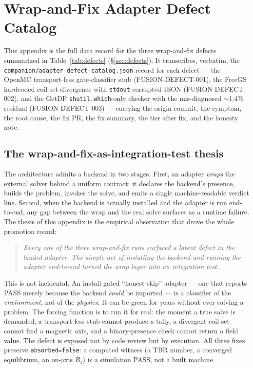 \section{Wrap-and-Fix Adapter Defect Catalog}
\label{app:adapters}

This appendix is the full data record for the three wrap-and-fix
defects summarized in Table~\ref{tab:defects}
(\S\ref{sec:defects}). It transcribes, verbatim, the
\texttt{companion/\allowbreak adapter-defect-catalog.json} record for each
defect --- the OpenMC transport-less gate-classifier stub
(FUSION-DEFECT-001), the FreeGS hardcoded coil-set divergence with
\texttt{stdout}-corrupted JSON (FUSION-DEFECT-002), and the GetDP
\texttt{shutil.which}-only checker with the mis-diagnosed $\sim$1.4\%
residual (FUSION-DEFECT-003) --- carrying the origin commit, the
symptom, the root cause, the fix PR, the fix summary, the tier after
fix, and the honesty note.

\subsection{The wrap-and-fix-as-integration-test thesis}
\label{app:adapters:thesis}

The architecture admits a backend in two stages. First, an adapter
\emph{wraps} the external solver behind a uniform contract: it declares
the backend's presence, builds the problem, invokes the solve, and emits
a single machine-readable verdict line. Second, when the backend is
actually installed and the adapter is run end-to-end, any gap between
the wrap and the real solve surfaces as a runtime failure. The thesis of
this appendix is the empirical observation that drove the whole
promotion round:

\begin{quote}
\emph{Every one of the three wrap-and-fix runs surfaced a latent defect
in the landed adapter. The simple act of installing the backend and
running the adapter end-to-end turned the wrap layer into an integration
test.}
\end{quote}

This is not incidental. An install-gated ``honest-skip'' adapter ---
one that reports PASS merely because the backend \emph{could} be
imported --- is a classifier of the \emph{environment}, not of the
\emph{physics}. It can be green for years without ever solving a
problem. The forcing function is to run it for real: the moment a true
solve is demanded, a transport-less stub cannot produce a tally, a
divergent coil set cannot find a magnetic axis, and a binary-presence
check cannot return a field value. The defect is exposed not by code
review but by execution. All three fixes preserve
\texttt{absorbed=false}: a computed witness (a TBR number, a converged
equilibrium, an on-axis $B_z$) is a simulation PASS, not a built machine.

